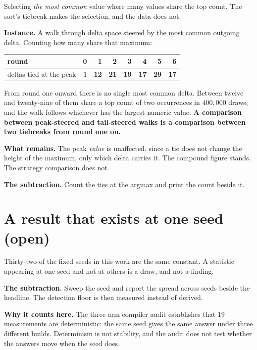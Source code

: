Selecting \emph{the most common} value where many values share the top count. The sort's tiebreak makes the selection, and the data does not.

\textbf{Instance.} A walk through delta space steered by the most common outgoing delta. Counting how many share that maximum:

\begin{center}
\begin{tabular}{@{}lrrrrrrr@{}}
\toprule
round & 0 & 1 & 2 & 3 & 4 & 5 & 6 \\
\midrule
deltas tied at the peak & 1 & \textbf{12} & \textbf{21} & \textbf{19} & \textbf{17} & \textbf{29} & \textbf{17} \\
\bottomrule
\end{tabular}
\end{center}

From round one onward there is no single most common delta. Between twelve and twenty-nine of them share a top count of two occurrences in \(400{,}000\) draws, and the walk follows whichever has the largest numeric value. \textbf{A comparison between peak-steered and tail-steered walks is a comparison between two tiebreaks from round one on.}

\textbf{What remains.} The peak \emph{value} is unaffected, since a tie does not change the height of the maximum, only which delta carries it. The compound figure stands. The strategy comparison does not.

\textbf{The subtraction.} Count the ties at the argmax and print the count beside it.

\section{A result that exists at one seed (open)}

Thirty-two of the fixed seeds in this work are the same constant. A statistic appearing at one seed and not at others is a draw, and not a finding.

\textbf{The subtraction.} Sweep the seed and report the spread across seeds beside the headline. The detection floor is then measured instead of derived.

\textbf{Why it counts here.} The three-arm compiler audit establishes that \(19\) measurements are deterministic: the same seed gives the same answer under three different builds. Determinism is not stability, and the audit does not test whether the answers move when the seed does.

